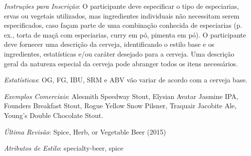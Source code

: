 \textit{Instruções para Inscrição}: O participante deve especificar o tipo de especiarias, ervas ou vegetais utilizados, mas ingredientes individuais não necessitam serem especificados, caso façam parte de uma combinação conhecida de especiarias (p. ex., torta de maçã com especiarias, curry em pó, pimenta em pó). O participante deve fornecer uma descrição da cerveja, identificando o estilo base e os ingredientes, estatísticas e/ou caráter desejado para a cerveja. Uma descrição geral da natureza especial da cerveja pode abranger todos os itens necessários.

\textit{Estatísticas}: OG, FG, IBU, SRM e ABV vão variar de acordo com a cerveja base.

\textit{Exemplos Comerciais}: Alesmith Speedway Stout, Elysian Avatar Jasmine IPA, Founders Breakfast Stout, Rogue Yellow Snow Pilsner, Traquair Jacobite Ale, Young's Double Chocolate Stout.

\textit{Última Revisão}: Spice, Herb, or Vegetable Beer (2015)

\textit{Atributos de Estilo}: specialty-beer, spice
